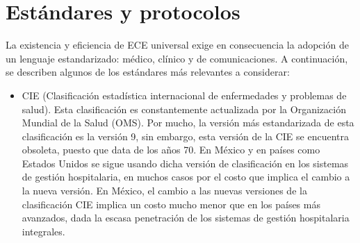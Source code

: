 \section{Estándares y protocolos}

La existencia y eficiencia de ECE universal exige en consecuencia la adopción de un lenguaje estandarizado: médico, clínico y de comunicaciones. A continuación, se describen algunos de los estándares más relevantes a considerar:
\begin{itemize}
  \item CIE (Clasificación estadística internacional de enfermedades y problemas de salud). Esta clasificación es constantemente actualizada por la Organización Mundial de la Salud (OMS). Por mucho, la versión más estandarizada de esta clasificación es la versión 9, sin embargo, esta versión de la CIE se encuentra obsoleta, puesto que data de los años 70. En México y en países como Estados Unidos se sigue usando dicha versión de clasificación en los sistemas de gestión hospitalaria, en muchos casos por el costo que implica el cambio a la nueva versión. En México, el cambio a las nuevas versiones de la clasificación CIE implica un costo mucho menor que en los países más avanzados, dada la escasa penetración de los sistemas de gestión hospitalaria integrales. \cite{marco2}


\end{itemize}
